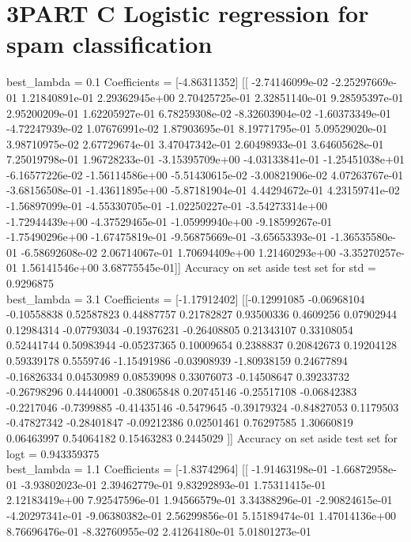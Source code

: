 \documentclass[pdftex,11pt]{article}
\begin{document}
\section{3PART C Logistic regression for spam classification}
best\_lambda =  0.1
Coefficients =  [-4.86311352] [[ -2.74146099e-02  -2.25297669e-01   1.21840891e-01   2.29362945e+00
    2.70425725e-01   2.32851140e-01   9.28595397e-01   2.95200209e-01
    1.62205927e-01   6.78259308e-02  -8.32603904e-02  -1.60373349e-01
   -4.72247939e-02   1.07676991e-02   1.87903695e-01   8.19771795e-01
    5.09529020e-01   3.98710975e-02   2.67729674e-01   3.47047342e-01
    2.60498933e-01   3.64605628e-01   7.25019798e-01   1.96728233e-01
   -3.15395709e+00  -4.03133841e-01  -1.25451038e+01  -6.16577226e-02
   -1.56114586e+00  -5.51430615e-02  -3.00821906e-02   4.07263767e-01
   -3.68156508e-01  -1.43611895e+00  -5.87181904e-01   4.44294672e-01
    4.23159741e-02  -1.56897099e-01  -4.55330705e-01  -1.02250227e-01
   -3.54273314e+00  -1.72944439e+00  -4.37529465e-01  -1.05999940e+00
   -9.18599267e-01  -1.75490296e+00  -1.67475819e-01  -9.56875669e-01
   -3.65653393e-01  -1.36535580e-01  -6.58692608e-02   2.06714067e-01
    1.70694409e+00   1.21460293e+00  -3.35270257e-01   1.56141546e+00
    3.68775545e-01]]
Accuracy on set aside test set for  std  =  0.9296875\\
best\_lambda =  3.1
Coefficients =  [-1.17912402] [[-0.12991085 -0.06968104 -0.10558838  0.52587823  0.44887757  0.21782827
   0.93500336  0.4609256   0.07902944  0.12984314 -0.07793034 -0.19376231
  -0.26408805  0.21343107  0.33108054  0.52441744  0.50983944 -0.05237365
   0.10009654  0.2388837   0.20842673  0.19204128  0.59339178  0.5559746
  -1.15491986 -0.03908939 -1.80938159  0.24677894 -0.16826334  0.04530989
   0.08539098  0.33076073 -0.14508647  0.39233732 -0.26798296  0.44440001
  -0.38065848  0.20745146 -0.25517108 -0.06842383 -0.2217046  -0.7399885
  -0.41435146 -0.5479645  -0.39179324 -0.84827053  0.1179503  -0.47827342
  -0.28401847 -0.09212386  0.02501461  0.76297585  1.30660819  0.06463997
   0.54064182  0.15463283  0.2445029 ]]
Accuracy on set aside test set for  logt  =  0.943359375\\
best\_lambda =  1.1
Coefficients =  [-1.83742964] [[ -1.91463198e-01  -1.66872958e-01  -3.93802023e-01   2.39462779e-01
    9.83292893e-01   1.75311415e-01   2.12183419e+00   7.92547596e-01
    1.94566579e-01   3.34388296e-01  -2.90824615e-01  -4.20297341e-01
   -9.06380382e-01   2.56299856e-01   5.15189474e-01   1.47014136e+00
    8.76696476e-01  -8.32760955e-02   2.41264180e-01   5.01801273e-01
\end{document}
